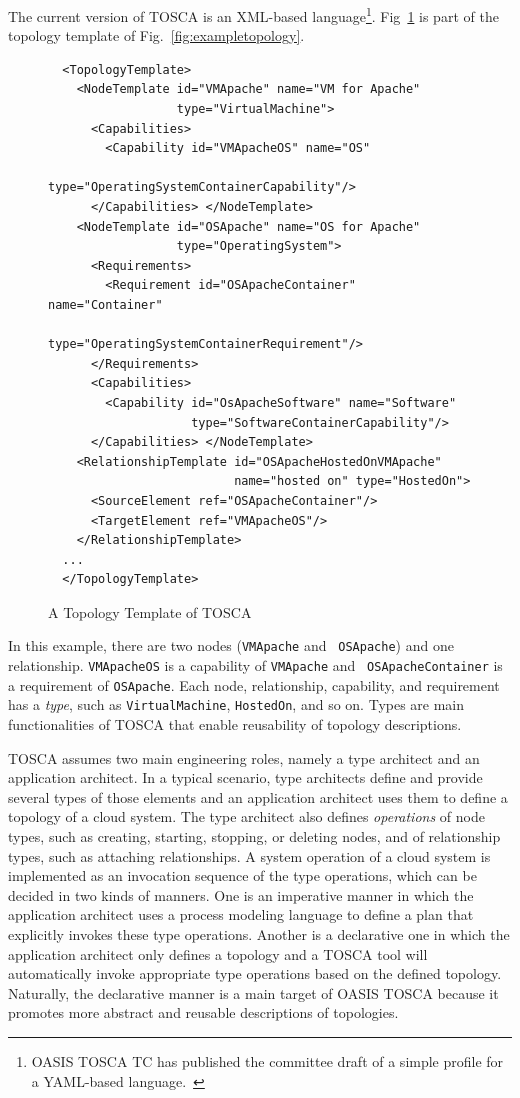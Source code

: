 \documentclass[12pt]{report}
\begin{document}
The current version of TOSCA is an XML-based language\footnote{OASIS
  TOSCA TC has published the committee draft of a simple profile for a
  YAML-based language.~\cite{TOSCAYAML}}. Fig~\ref{fig:topology} is 
part of the topology template of Fig.~\ref{fig:exampletopology}.
\begin{figure}
\small
\begin{verbatim}
  <TopologyTemplate>
    <NodeTemplate id="VMApache" name="VM for Apache" 
                  type="VirtualMachine">
      <Capabilities>
        <Capability id="VMApacheOS" name="OS" 
                    type="OperatingSystemContainerCapability"/>
      </Capabilities> </NodeTemplate>
    <NodeTemplate id="OSApache" name="OS for Apache" 
                  type="OperatingSystem">
      <Requirements>
        <Requirement id="OSApacheContainer" name="Container" 
                     type="OperatingSystemContainerRequirement"/>
      </Requirements>
      <Capabilities>
        <Capability id="OsApacheSoftware" name="Software" 
                    type="SoftwareContainerCapability"/>
      </Capabilities> </NodeTemplate>
    <RelationshipTemplate id="OSApacheHostedOnVMApache"
                          name="hosted on" type="HostedOn">
      <SourceElement ref="OSApacheContainer"/>
      <TargetElement ref="VMApacheOS"/>
    </RelationshipTemplate>
  ...
  </TopologyTemplate>
\end{verbatim}
\normalsize
\caption{A Topology Template of TOSCA}
\label{fig:topology}
\end{figure}
In this example, there are two nodes ({\tt VMApache} and {\tt
  OSApache}) and one relationship.  
{\tt VMApacheOS} is a capability of {\tt VMApache} and {\tt
  OSApacheContainer} is a requirement of {\tt OSApache}.  
Each node, relationship, capability, and requirement
has a {\it type}, such as {\tt VirtualMachine}, {\tt HostedOn}, and so
on. Types are main functionalities of TOSCA that enable reusability of
topology descriptions.

TOSCA assumes two main engineering roles, namely a type architect and
an application architect. In a typical scenario, type architects
define and provide several types of those elements and an application
architect uses them to define a topology of a cloud system. The type
architect also defines {\it operations} of node types, such as
creating, starting, stopping, or deleting nodes, and of relationship
types, such as attaching relationships. A system operation of a cloud
system is implemented as an invocation sequence of the type
operations, which can be decided in two kinds of manners. One is an
imperative manner in which the application architect uses a process
modeling language to define a plan that explicitly invokes these type
operations. Another is a declarative one in which the application
architect only defines a topology and a TOSCA tool will automatically
invoke appropriate type operations based on the defined
topology. Naturally, the declarative manner is a main target of OASIS
TOSCA because it promotes more abstract and reusable descriptions of
topologies.
\end{document}
